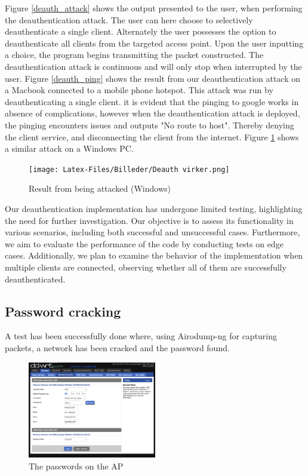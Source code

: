 Figure \ref{deauth_attack} shows the output presented to the user, when performing the deauthentication attack. The user can here choose to selectively deauthenticate a single client. Alternately the user possesses the option to deauthenticate all clients from the targeted access point. Upon the user inputting a choice, the program begins transmitting the packet constructed. The deauthentication attack is continuous and will only stop when interrupted by the user. 
Figure \ref{deauth_ping} shows the result from our deauthentication attack on a Macbook connected to a mobile phone hotspot. This attack was run by deauthenticating a single client. it is evident that the pinging to google works in absence of complications, however when the deauthentication attack is deployed, the pinging encounters issues and outputs "No route to host". Thereby denying the client service, and disconnecting the client from the internet. 
Figure \ref{deauth_ping_windows} shows a similar attack on a Windows PC.

\begin{figure}[!htbp]
    \centering
    \texttt{[image: Latex-Files/Billeder/Deauth virker.png]}
    \caption{Result from being attacked (Windows)}
    \label{deauth_ping_windows}
\end{figure}


Our deauthentication implementation has undergone limited testing, highlighting the need for further investigation. Our objective is to assess its functionality in various scenarios, including both successful and unsuccessful cases. Furthermore, we aim to evaluate the performance of the code by conducting tests on edge cases. Additionally, we plan to examine the behavior of the implementation when multiple clients are connected, observing whether all of them are successfully deauthenticated. 


\subsection{Password cracking}
A test has been successfully done where, using Airodump-ng for capturing packets, a network has been cracked and the password found. 

\begin{figure}[!htbp]
    \centering
    \includegraphics[width=0.5\textwidth]{Latex-Files/Billeder/Kode2.png}
    \caption{The passwords on the AP}
    \label{Crack2}
\end{figure}

